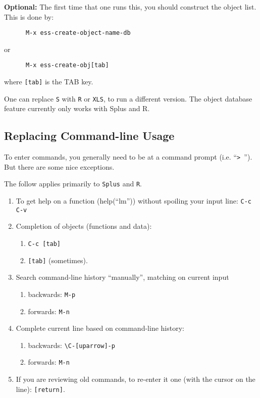 \documentclass{article}
\begin{document}
\textbf{Optional: } The first time that one runs this, you should
construct the object list.  This is done by:
\begin{verbatim}
      M-x ess-create-object-name-db
\end{verbatim}
or
\begin{verbatim}
      M-x ess-create-obj[tab]
\end{verbatim}
where \verb+[tab]+ is the TAB key.

One can replace \verb+S+ with \verb+R+ or \verb+XLS+, to run a
different version.  The object database feature currently only works
with Splus and R.

\subsection{Replacing Command-line Usage}
\label{sec:commandline:usage}

To enter commands, you generally need to be at a command prompt (i.e.
``\verb+> +'').  But there are some nice exceptions.

The follow applies primarily to \verb+Splus+ and \verb+R+.

\begin{enumerate}
\item To get help on a function (help(``lm'')) without spoiling your
  input line: \verb+C-c C-v+
\item Completion of objects (functions and data): 
  \begin{enumerate}
  \item \verb+C-c [tab]+ 
  \item \verb+[tab]+ (sometimes).
\end{enumerate}
\item Search command-line history ``manually'', matching on current input
  \begin{enumerate}
  \item backwards: \verb+M-p+
  \item forwards:  \verb+M-n+
  \end{enumerate}
\item Complete current line based on command-line history:
  \begin{enumerate}
  \item backwards: \verb+\C-[uparrow]-p+
  \item forwards:  \verb+M-n+
  \end{enumerate}
\item If you are reviewing old commands, to re-enter it one (with the
  cursor on the line): \verb+[return]+.  
\end{enumerate}
\end{document}
